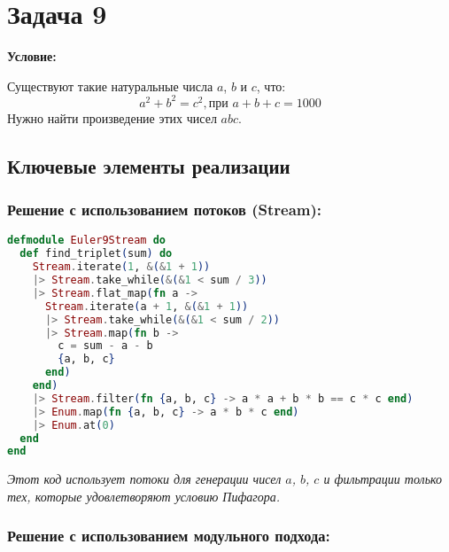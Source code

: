 \documentclass[a4paper]{article}
\begin{document}

\thispagestyle{empty}


\newpage
\thispagestyle{empty}


\section*{Задача 9}

\textbf{Условие:}

Существуют такие натуральные числа $a$, $b$ и $c$, что:
\[
	a^2 + b^2 = c^2, \text{при } a + b + c = 1000
\]
Нужно найти произведение этих чисел $abc$.

\subsection*{Ключевые элементы реализации}

\subsubsection*{Решение с использованием потоков (Stream):}

\begin{lstlisting}[language=elixir, caption={Генерация чисел с использованием Stream},captionpos=b]
defmodule Euler9Stream do
  def find_triplet(sum) do
    Stream.iterate(1, &(&1 + 1))
    |> Stream.take_while(&(&1 < sum / 3))
    |> Stream.flat_map(fn a ->
      Stream.iterate(a + 1, &(&1 + 1))
      |> Stream.take_while(&(&1 < sum / 2))
      |> Stream.map(fn b ->
        c = sum - a - b
        {a, b, c}
      end)
    end)
    |> Stream.filter(fn {a, b, c} -> a * a + b * b == c * c end)
    |> Enum.map(fn {a, b, c} -> a * b * c end)
    |> Enum.at(0)
  end
end
\end{lstlisting}

\textit{Этот код использует потоки для генерации чисел $a$, $b$, $c$ и фильтрации только тех, которые удовлетворяют условию Пифагора.}

\subsubsection*{Решение с использованием модульного подхода:}
\end{document}
